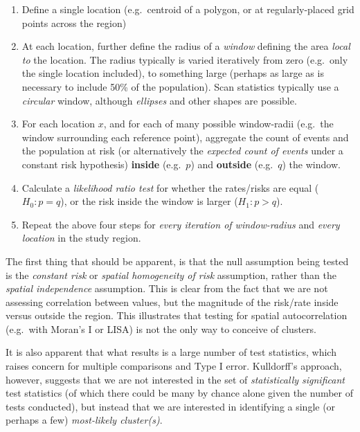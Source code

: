 \documentclass[
]{book}
\providecommand{\tightlist}{%
  \setlength{\itemsep}{0pt}\setlength{\parskip}{0pt}}
\begin{document}
\begin{enumerate}
\def\labelenumi{\arabic{enumi}.}
\tightlist
\item
  Define a single location (e.g.~centroid of a polygon, or at regularly-placed grid points across the region)
\item
  At each location, further define the radius of a \emph{window} defining the area \emph{local to} the location. The radius typically is varied iteratively from zero (e.g.~only the single location included), to something large (perhaps as large as is necessary to include 50\% of the population). Scan statistics typically use a \emph{circular} window, although \emph{ellipses} and other shapes are possible.
\item
  For each location \(x\), and for each of many possible window-radii (e.g.~the window surrounding each reference point), aggregate the count of events and the population at risk (or alternatively the \emph{expected count of events} under a constant risk hypothesis) \textbf{inside} (e.g.~\(p\)) and \textbf{outside} (e.g.~\(q\)) the window.
\item
  Calculate a \emph{likelihood ratio test} for whether the rates/risks are equal (\(H_0: p=q\)), or the risk inside the window is larger (\(H_1: p>q\)).
\item
  Repeat the above four steps for \emph{every iteration of window-radius} and \emph{every location} in the study region.
\end{enumerate}

The first thing that should be apparent, is that the null assumption being tested is the \emph{constant risk} or \emph{spatial homogeneity of risk} assumption, rather than the \emph{spatial independence} assumption. This is clear from the fact that we are not assessing correlation between values, but the magnitude of the risk/rate inside versus outside the region. This illustrates that testing for spatial autocorrelation (e.g.~with Moran's I or LISA) is not the only way to conceive of clusters.

It is also apparent that what results is a large number of test statistics, which raises concern for multiple comparisons and Type I error. Kulldorff's approach, however, suggests that we are not interested in the set of \emph{statistically significant} test statistics (of which there could be many by chance alone given the number of tests conducted), but instead that we are interested in identifying a single (or perhaps a few) \emph{most-likely cluster(s)}.
\end{document}
